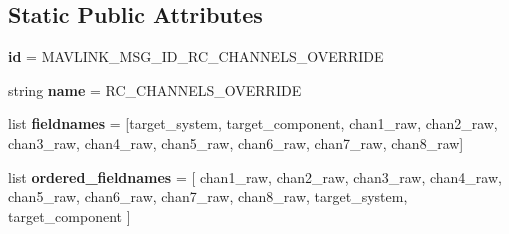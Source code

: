 \subsection*{Static Public Attributes}
\begin{DoxyCompactItemize}
\item 
\mbox{\label{classpymavlink_1_1dialects_1_1v10_1_1MAVLink__rc__channels__override__message_a383c3f33442b3d9dff4cdb99b0771e15}} 
{\bfseries id} = M\+A\+V\+L\+I\+N\+K\+\_\+\+M\+S\+G\+\_\+\+I\+D\+\_\+\+R\+C\+\_\+\+C\+H\+A\+N\+N\+E\+L\+S\+\_\+\+O\+V\+E\+R\+R\+I\+DE
\item 
\mbox{\label{classpymavlink_1_1dialects_1_1v10_1_1MAVLink__rc__channels__override__message_acdaf452a06929c1a0357db83901d07bf}} 
string {\bfseries name} = \textquotesingle{}R\+C\+\_\+\+C\+H\+A\+N\+N\+E\+L\+S\+\_\+\+O\+V\+E\+R\+R\+I\+DE\textquotesingle{}
\item 
\mbox{\label{classpymavlink_1_1dialects_1_1v10_1_1MAVLink__rc__channels__override__message_a936cf6874bba5fef35ad8e618169f8b3}} 
list {\bfseries fieldnames} = \mbox{[}\textquotesingle{}target\+\_\+system\textquotesingle{}, \textquotesingle{}target\+\_\+component\textquotesingle{}, \textquotesingle{}chan1\+\_\+raw\textquotesingle{}, \textquotesingle{}chan2\+\_\+raw\textquotesingle{}, \textquotesingle{}chan3\+\_\+raw\textquotesingle{}, \textquotesingle{}chan4\+\_\+raw\textquotesingle{}, \textquotesingle{}chan5\+\_\+raw\textquotesingle{}, \textquotesingle{}chan6\+\_\+raw\textquotesingle{}, \textquotesingle{}chan7\+\_\+raw\textquotesingle{}, \textquotesingle{}chan8\+\_\+raw\textquotesingle{}\mbox{]}
\item 
\mbox{\label{classpymavlink_1_1dialects_1_1v10_1_1MAVLink__rc__channels__override__message_a71e21d88f453a130498325552b3dd2da}} 
list {\bfseries ordered\+\_\+fieldnames} = \mbox{[} \textquotesingle{}chan1\+\_\+raw\textquotesingle{}, \textquotesingle{}chan2\+\_\+raw\textquotesingle{}, \textquotesingle{}chan3\+\_\+raw\textquotesingle{}, \textquotesingle{}chan4\+\_\+raw\textquotesingle{}, \textquotesingle{}chan5\+\_\+raw\textquotesingle{}, \textquotesingle{}chan6\+\_\+raw\textquotesingle{}, \textquotesingle{}chan7\+\_\+raw\textquotesingle{}, \textquotesingle{}chan8\+\_\+raw\textquotesingle{}, \textquotesingle{}target\+\_\+system\textquotesingle{}, \textquotesingle{}target\+\_\+component\textquotesingle{} \mbox{]}

\end{DoxyCompactItemize}
